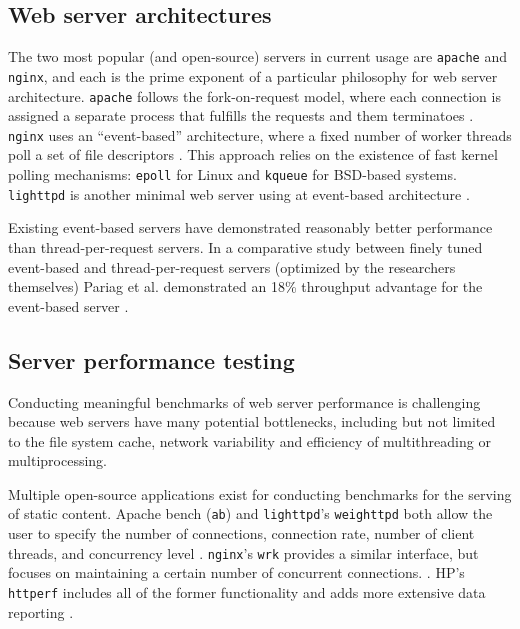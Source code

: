 \documentclass[twoside,10pt]{article}
\begin{document}
\begin{multicols}{2}
\subsection{Web server architectures}

The two most popular (and open-source) servers in current usage are
\verb+apache+ and \verb+nginx+, and each is the prime exponent of a
particular philosophy for web server architecture. \verb+apache+
follows the fork-on-request model, where each connection is assigned a
separate process that fulfills the requests and them terminatoes
\cite{fielding1997apache}. \verb+nginx+ uses an ``event-based''
architecture, where a fixed number of worker threads poll a set of
file descriptors \cite{syosevnginx}. This approach relies on the
existence of fast kernel polling mechanisms: \verb+epoll+ for Linux
and \verb+kqueue+ for BSD-based systems. \verb+lighttpd+ is another
minimal web server using at event-based architecture
\cite{kneschke2003lighttpd}.

Existing event-based servers have demonstrated reasonably better
performance than thread-per-request servers. In a comparative study
between finely tuned event-based and thread-per-request servers
(optimized by the researchers themselves) Pariag et al. demonstrated
an 18\% throughput advantage for the event-based server
\cite{pariag2007comparing}.

\subsection{Server performance testing}

Conducting meaningful benchmarks of web server performance is
challenging because web servers have many potential bottlenecks,
including but not limited to the file system cache, network
variability and efficiency of multithreading or multiprocessing.

Multiple open-source applications exist for conducting benchmarks for
the serving of static content. Apache bench (\verb+ab+) and
\verb+lighttpd+'s \verb+weighttpd+ both allow the user to specify the
number of connections, connection rate, number of client threads, and
concurrency level
\cite{fielding1997apache,kneschke2003lighttpd}. \verb+nginx+'s
\verb+wrk+ provides a similar interface, but focuses on maintaining a
certain number of concurrent connections. \cite{syosevnginx}. HP's
\verb+httperf+ includes all of the former functionality and adds more
extensive data reporting \cite{mosberger1998httperf}.


\end{multicols}
\end{document}
